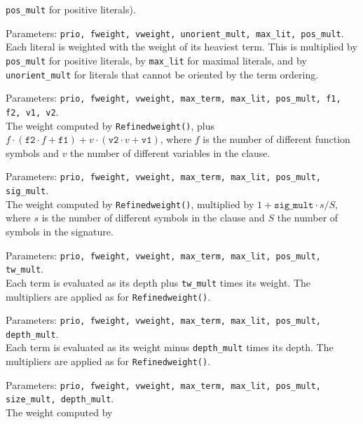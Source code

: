 \documentclass{report}
\begin{document}
\begin{description}
  \texttt{pos\_mult} for positive literals).
\item[\texttt{OrientLMaxWeight}:] Parameters: \texttt{prio, fweight,
    vweight, unorient\_mult, max\_lit, pos\_mult}.\\
  Each literal is weighted with the weight
  of its heaviest term. This is multiplied by \texttt{pos\_mult} for
  positive literals, by \texttt{max\_lit} for maximal literals, and
  by \texttt{unorient\_mult} for literals that cannot be oriented by
  the term ordering.
\item[\texttt{Diversityweight}:] Parameters: \texttt{prio, fweight,
    vweight, max\_term, max\_lit, pos\_mult, f1, f2, v1, v2}.\\
  The weight computed by
  \texttt{Refinedweight()}, plus $f\cdot(\mathtt{f2}\cdot f +
  \mathtt{f1}) + v\cdot(\mathtt{v2}\cdot v + \mathtt{v1})$, where $f$
  is the number of different function symbols and $v$ the number of
  different variables in the clause.
\item[\texttt{Sigweight}:] Parameters: \texttt{prio, fweight, vweight,
    max\_term, max\_lit, pos\_mult, sig\_mult}.\\
  The weight computed by
  \texttt{Refinedweight()}, multiplied by $1+\mathtt{sig\_mult}\cdot
  s/S$, where $s$ is the number of different symbols in the clause and
  $S$ the number of symbols in the signature.
\item[\texttt{Depthweight}:] Parameters: \texttt{prio, fweight,
    vweight, max\_term, max\_lit, pos\_mult, tw\_mult}.\\
  Each term is evaluated as its depth plus
  \texttt{tw\_mult} times its weight. The multipliers are applied as
  for \texttt{Refinedweight()}.
\item[\texttt{WLessDWeight}:] Parameters: \texttt{prio, fweight,
    vweight, max\_term, max\_lit, pos\_mult, depth\_mult}.\\
  Each term is evaluated as its weight
  minus \texttt{depth\_mult} times its depth. The multipliers are
  applied as for \texttt{Refinedweight()}.
\item[\texttt{Proofweight}:] Parameters: \texttt{prio, fweight,
    vweight, max\_term, max\_lit, pos\_mult, size\_mult,
    depth\_mult}.\\
  The weight computed by

\end{description}
\end{document}
